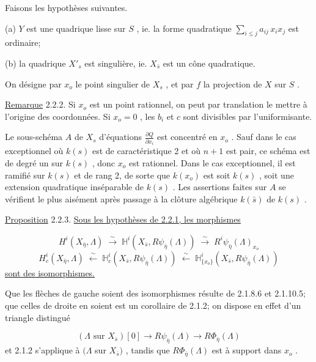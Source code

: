Faisons les hypothèses suivantes.

(a) $Y$ est une quadrique lisse sur $S$ , ie. la forme quadratique $\sum_{i \leq j} a_{ij}\, x_i x_j$ est ordinaire;

(b) la quadrique $X'_s$ est singulière, ie. $X_{\bar{s}}$ est un cône quadratique.

On désigne par $x_o$ le point singulier de $X_s$ , et par $f$ la projection de $X$ sur $S$ .

\underline{Remarque} 2.2.2. Si $x_o$ est un point rationnel, on peut par translation le mettre à l'origine des coordonnées. Si $x_o = 0$ , les $b_i$ et $c$ sont divisibles par l'uniformisante.

Le sous-schéma $A$ de $X_s$ d'équations $\frac{\partial Q}{\partial x_i}$ est concentré en $x_o$ . Sauf dans le cas exceptionnel où $k(s)$ est de caractéristique 2 et où $n+1$ est pair, ce schéma est de degré un sur $k(s)$ , donc $x_o$ est rationnel. Dans le cas exceptionnel, il est ramifié sur $k(s)$ et de rang 2, de sorte que $k(x_o)$ est soit $k(s)$ , soit une extension quadratique inséparable de $k(s)$ . Les assertions faites sur $A$ se vérifient le plus aisément après passage à la clôture algébrique $k(\bar{s})$ de $k(s)$ .

\underline{Proposition} 2.2.3. \underline{Sous les hypothèses de 2.2.1, les morphismes} 



\begin{equation*}
 H^i(X_{\bar{\eta}} , \Lambda) \;\stackrel{\sim}{\longrightarrow}\; \mathbb{H}^i(X_{\bar{s}}, R\psi_{\bar{\eta}} (\Lambda)) \;\stackrel{\sim}{\longrightarrow}\; R^i\psi_{\bar{\eta}}(\Lambda)_{x_o}
\end{equation*}
\begin{equation*}
H_c^i(X_{\bar{\eta}} , \Lambda) \;\stackrel{\sim}{\longleftarrow}\; \mathbb{H}_c^i(X_{\bar{s}}, R\psi_{\bar{\eta}} (\Lambda)) \;\stackrel{\sim}{\longleftarrow}\; \mathbb{H}^i_{\{x_o\}}(X_{\bar{s}}, R\psi_{\bar{\eta}}(\Lambda))
\end{equation*}
\underline{sont des isomorphismes.}

Que les flèches de gauche soient des isomorphismes résulte de 2.1.8.6 et 2.1.10.5; que celles de droite en soient est un corollaire de 2.1.2; on dispose en effet d'un triangle distingué

\begin{equation*}
(\Lambda \mbox{ sur } X_{\bar{s}})[0] \longrightarrow R\psi_{\bar{\eta}}(\Lambda) \longrightarrow R\Phi_{\bar{\eta}}(\Lambda)
\end{equation*}
et 2.1.2 s'applique à $(\Lambda$ sur $X_{\bar{s}})$ , tandis que $R\Phi_{\bar{\eta}}(\Lambda)$ est à support dans $x_o$ .

